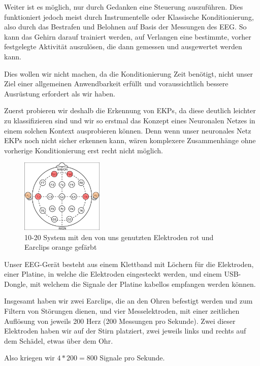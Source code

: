 \documentclass{scrartcl}
\begin{document}
	Weiter ist es möglich, nur durch Gedanken eine Steuerung auszuführen. Dies funktioniert jedoch meist durch Instrumentelle oder Klassische Konditionierung, also durch das Bestrafen und Belohnen auf Basis der Messungen des EEG. So kann das Gehirn darauf trainiert werden, auf Verlangen eine bestimmte, vorher festgelegte Aktivität auszulösen, die dann gemessen und ausgewertet werden kann.  \cite{BCIChaudhary}

	Dies wollen wir nicht machen, da die Konditionierung Zeit benötigt, nicht unser Ziel einer allgemeinen Anwendbarkeit erfüllt und voraussichtlich bessere Ausrüstung erfordert als wir haben.

	Zuerst probieren wir deshalb die Erkennung von EKPs, da diese deutlich leichter zu klassifizieren sind und wir so erstmal das Konzept eines Neuronalen Netzes in einem solchen Kontext ausprobieren können. Denn wenn unser neuronales Netz EKPs noch nicht sicher erkennen kann, wären komplexere Zusammenhänge ohne vorherige Konditionierung erst recht nicht möglich.
	
	\begin{figure}
		\centering
		\includegraphics[width=0.35\textwidth]{pictures/elektroden-platzierungen.png}
		\caption{10-20 System mit den von uns genutzten Elektroden rot und Earclips orange gefärbt}
	\end{figure}

	Unser EEG-Gerät besteht aus einem Klettband mit Löchern für die Elektroden, einer Platine, in welche die Elektroden eingesteckt werden, und einem USB-Dongle, mit welchem die Signale der Platine kabellos empfangen werden können.

	Insgesamt haben wir zwei Earclips, die an den Ohren befestigt werden und zum Filtern von Störungen dienen, und vier Messelektroden, mit einer zeitlichen Auflösung von jeweils 200 Herz (200 Messungen pro Sekunde). Zwei dieser Elektroden haben wir auf der Stirn platziert, zwei jeweils links und rechts auf dem Schädel, etwas über dem Ohr.

	Also kriegen wir $4 * 200 = 800$ Signale pro Sekunde.
	
\end{document}
